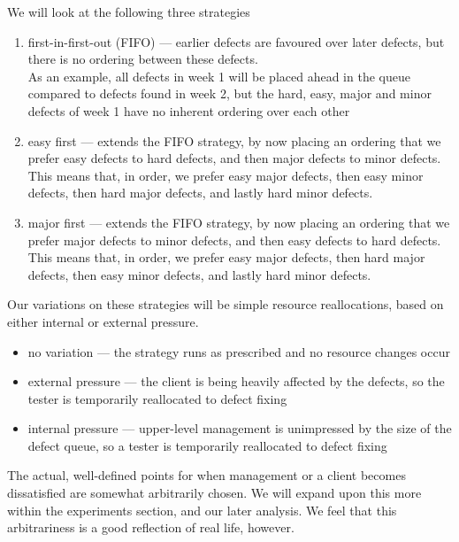 We will look at the following three strategies
\begin{enumerate}
	\item first-in-first-out (FIFO) --- earlier defects are favoured over later defects, but there is no
ordering between these defects.\\
	As an example, all defects in week 1 will be placed ahead in the queue compared to defects found
in week 2, but the hard, easy, major and minor defects of week 1 have no inherent ordering over each
other
	\item easy first --- extends the FIFO strategy, by now placing an ordering that we prefer easy
defects to hard defects, and then major defects to minor defects.\\
	This means that, in order, we prefer easy major defects, then easy minor defects, then hard major
defects, and lastly hard minor defects.\\
	\item major first --- extends the FIFO strategy, by now placing an ordering that we prefer major 
defects to minor defects, and then easy defects to hard defects.\\
	This means that, in order, we prefer easy major defects, then hard major defects, then easy minor 
defects, and lastly hard minor defects.\\
\end{enumerate}

Our variations on these strategies will be simple resource reallocations, based on either internal
or external pressure.
\begin{itemize}
	\item no variation --- the strategy runs as prescribed and no resource changes occur
	\item external pressure --- the client is being heavily affected by the defects, so the tester is
temporarily reallocated to defect fixing
	\item internal pressure --- upper-level management is unimpressed by the size of the defect queue,
so a tester is temporarily reallocated to defect fixing
\end{itemize}

The actual, well-defined points for when management or a client becomes dissatisfied are somewhat
arbitrarily chosen.
We will expand upon this more within the experiments section, and our later analysis.
We feel that this arbitrariness is a good reflection of real life, however.

